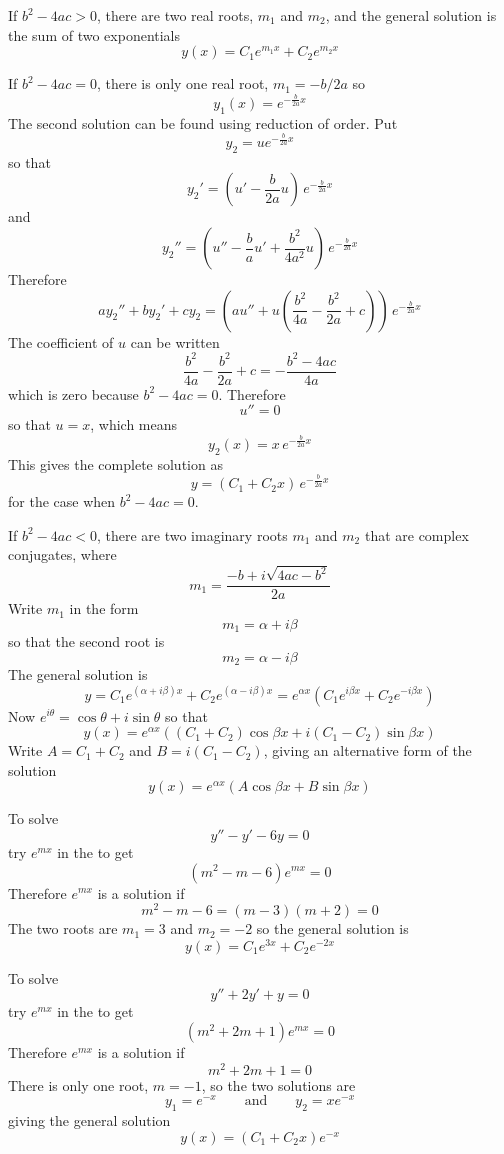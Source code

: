 If $b^2-4ac>0$, there are two real roots, $m_1$ and $m_2$, and the general
solution is the sum of two exponentials
$$y(x)=C_1e^{m_1x}+C_2e^{m_2x}$$

If $b^2-4ac=0$, there is only one real root, $m_1=-b/2a$ so
$$y_1(x)=e^{-\frac{b}{2a}x}$$
The second solution can be found using reduction of order.  Put
$$y_2=ue^{-\frac{b}{2a}x}$$
so that
$$y_2'=\left(u'-\frac{b}{2a}u\right)\,e^{-\frac{b}{2a}x}$$
and
$$y_2''=\left(u''-\frac{b}{a}u'+\frac{b^2}{4a^2}u\right)\,e^{-\frac{b}{2a}x}$$
Therefore
$$ay_2''+by_2'+cy_2=\left(au''+u\left(\frac{b^2}{4a}-\frac{b^2}{2a}+c\right)
\right)\,e^{-\frac{b}{2a}x}$$
The coefficient of $u$ can be written
$$\frac{b^2}{4a}-\frac{b^2}{2a}+c=-\frac{b^2-4ac}{4a}$$
which is zero because $b^2-4ac=0$.  Therefore
$$u''=0$$
so that $u=x$, which means
$$y_2(x)=x\,e^{-\frac{b}{2a}x}$$
This gives the complete solution as
$$y=(C_1+C_2x)\,e^{-\frac{b}{2a}x}$$
for the case when $b^2-4ac=0$.

If $b^2-4ac<0$, there are two imaginary roots $m_1$ and $m_2$ that are 
complex conjugates, where
$$m_1=\frac{-b+i\sqrt{4ac-b^2}}{2a}$$
Write $m_1$ in the form
$$m_1=\alpha+i\beta$$
so that the second root is
$$m_2=\alpha-i\beta$$
The general solution is
$$y=C_1e^{(\alpha+i\beta)x}+C_2e^{(\alpha-i\beta)x}
=e^{\alpha x}\left(C_1e^{i\beta x}+C_2e^{-i\beta x}\right)$$
Now $e^{i\theta}=\cos\theta+i\sin\theta$ so that
$$y(x)=e^{\alpha x}\left((C_1+C_2)\cos\beta x+i(C_1-C_2)\sin\beta x\right)$$
Write $A=C_1+C_2$ and $B=i(C_1-C_2)$, giving an alternative form of the
solution
$$y(x)=e^{\alpha x}\left(A\cos\beta x+B\sin\beta x\right)$$

\begin{example}
To solve
$$y''-y'-6y=0$$
try $e^{mx}$ in the \ODE to get
$$(m^2-m-6)e^{mx}=0$$
Therefore $e^{mx}$ is a solution if
$$m^2-m-6=(m-3)(m+2)=0$$
The two roots are $m_1=3$ and $m_2=-2$ so the general solution is
$$y(x)=C_1e^{3x}+C_2e^{-2x}$$
\end{example}

\begin{example}
To solve
$$y''+2y'+y=0$$
try $e^{mx}$ in the \ODE to get
$$(m^2+2m+1)e^{mx}=0$$
Therefore $e^{mx}$ is a solution if
$$m^2+2m+1=0$$
There is only one root, $m=-1$, so the two solutions are
$$y_1=e^{-x}\qquad\mbox{and}\qquad y_2=xe^{-x}$$
giving the general solution
$$y(x)=(C_1+C_2x)e^{-x}$$
\end{example}

